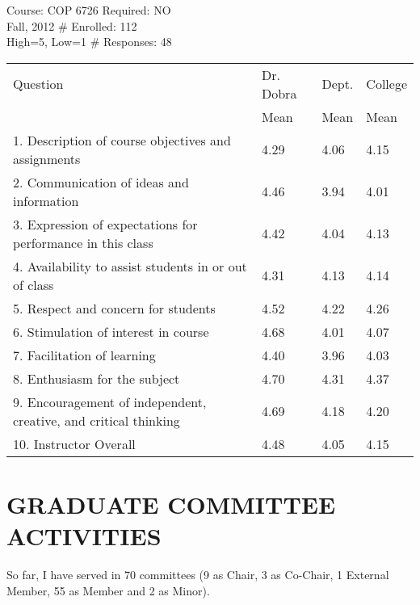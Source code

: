 \documentclass{article}
\begin{document}
\noindent Course: COP 6726 \hfill Required: NO \\
\noindent Fall, 2012 \hfill \# Enrolled: 112\\
High=5, Low=1 \hfill \# Responses: 48
\nopagebreak[4]
\begin{center}
  \begin{tabular}{llll}
    Question & Dr. Dobra & Dept. & College \\
    & Mean & Mean & Mean \\
    \hline
    1. Description of course objectives and assignments & 4.29	&4.06	&4.15 \\
    2. Communication of ideas and information & 4.46	&3.94	&4.01 \\
    3. Expression of expectations for performance in this class  & 4.42	&4.04	&4.13\\
    4. Availability to assist students in or out of class & 4.31 &4.13	&4.14 \\
    5. Respect and concern for students & 4.52	&4.22	&4.26 \\
    6. Stimulation of interest in course & 4.68	&4.01	&4.07 \\
    7. Facilitation of learning & 4.40 & 3.96&	4.03 \\
    8. Enthusiasm for the subject & 4.70 &4.31	&4.37 \\
    9. Encouragement of independent, creative, and critical thinking & 4.69&	4.18&	4.20\\
    \hline
    10. Instructor Overall & 4.48 &  4.05 & 4.15 \\
  \end{tabular}
\end{center}


\section{GRADUATE COMMITTEE ACTIVITIES}

So far, I have served in 70 committees (9 as Chair, 3 as Co-Chair, 1 External Member, 55 as Member and 2 as Minor).
\end{document}
